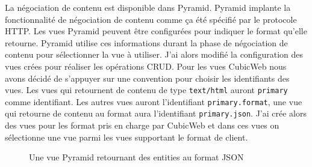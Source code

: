 La négociation de contenu est disponible dans Pyramid. Pyramid implante la
fonctionnalité de négociation de contenu comme ça été spécifié par le protocole
HTTP. Les vues Pyramid peuvent être configurées pour indiquer le format qu'elle
retourne. Pyramid utilise ces informations durant la phase de négociation de
contenu pour sélectionner la vue à utiliser. J'ai alors modifié la
configuration des vues crées pour réaliser les opérations CRUD. Pour les vues
CubicWeb nous avons décidé de s'appuyer sur une convention pour choisir les
identifiants des vues. Les vues qui retournent de contenu de type
\texttt{text/html} auront \texttt{primary} comme identifiant. Les autres vues
auront l'identifiant \texttt{primary.format}, une vue qui retourne de contenu
au format  aura l'identifiant \texttt{primary.json}. J'ai
crée alors des vues pour les format pris en charge par CubicWeb et dans ces
vues on sélectionne une vue parmi les vues supportant le format de client.   


\begin{figure}[htp] 
    \centering
    \caption{Une vue Pyramid retournant des entities au format JSON} 
    \label{fig:getjson} 
\end{figure}
